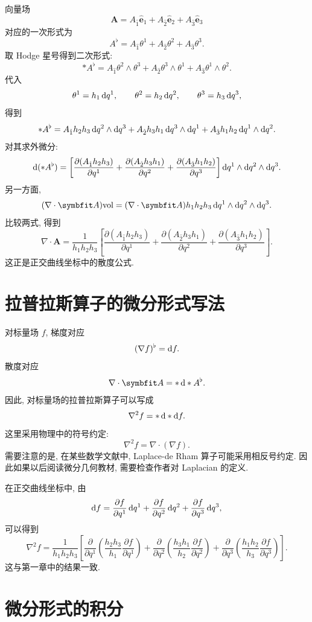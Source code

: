 向量场
\[
\bm{A}
=
A_{\hat 1}\hat{\bm{e}}_1
+
A_{\hat 2}\hat{\bm{e}}_2
+
A_{\hat 3}\hat{\bm{e}}_3
\]
对应的一次形式为
\[
A^\flat
=
A_{\hat 1}\theta^1
+
A_{\hat 2}\theta^2
+
A_{\hat 3}\theta^3.
\]
取 Hodge 星号得到二次形式: 
\[
*A^\flat
=
A_{\hat 1}\theta^2\wedge\theta^3
+
A_{\hat 2}\theta^3\wedge\theta^1
+
A_{\hat 3}\theta^1\wedge\theta^2.
\]
代入
\[
\theta^1=h_1\mathop{}\!\mathrm{d} q^1,
\qquad
\theta^2=h_2\mathop{}\!\mathrm{d} q^2,
\qquad
\theta^3=h_3\mathop{}\!\mathrm{d} q^3,
\]
得到
\[
*A^\flat
=
A_{\hat 1}h_2h_3\mathop{}\!\mathrm{d} q^2\wedge \mathop{}\!\mathrm{d} q^3
+
A_{\hat 2}h_3h_1\mathop{}\!\mathrm{d} q^3\wedge \mathop{}\!\mathrm{d} q^1
+
A_{\hat 3}h_1h_2\mathop{}\!\mathrm{d} q^1\wedge \mathop{}\!\mathrm{d} q^2.
\]
对其求外微分: 
\[
\mathop{}\!\mathrm{d}(*A^\flat)
=
\left[
\frac{\partial(A_{\hat 1}h_2h_3)}{\partial q^1}
+
\frac{\partial(A_{\hat 2}h_3h_1)}{\partial q^2}
+
\frac{\partial(A_{\hat 3}h_1h_2)}{\partial q^3}
\right]
\mathop{}\!\mathrm{d} q^1\wedge \mathop{}\!\mathrm{d} q^2\wedge \mathop{}\!\mathrm{d} q^3.
\]
另一方面, 
\[
(\nabla\cdot\bm{A})\mathrm{vol}
=
(\nabla\cdot\bm{A})
h_1h_2h_3
\dif q^1\wedge \dif q^2\wedge \dif q^3.
\]
比较两式, 得到
\[
\nabla\cdot\bm{A}
=
\frac{1}{h_1h_2h_3}
\left[
\frac{\partial(A_{\hat 1}h_2h_3)}{\partial q^1}
+
\frac{\partial(A_{\hat 2}h_3h_1)}{\partial q^2}
+
\frac{\partial(A_{\hat 3}h_1h_2)}{\partial q^3}
\right].
\]
这正是正交曲线坐标中的散度公式. 

\section{拉普拉斯算子的微分形式写法}

对标量场 $f$, 梯度对应
\[
(\nabla f)^\flat=\mathop{}\!\mathrm{d} f.
\]
散度对应
\[
\nabla\cdot\bm{A}=*\dif *A^\flat.
\]
因此, 对标量场的拉普拉斯算子可以写成
\[
\nabla^2 f=*\mathop{}\!\mathrm{d} *\mathop{}\!\mathrm{d} f.
\]
这里采用物理中的符号约定: 
\[
\nabla^2 f=\nabla\cdot(\nabla f).
\]
需要注意的是, 在某些数学文献中, Laplace-de Rham 算子可能采用相反号约定. 因此如果以后阅读微分几何教材, 需要检查作者对 Laplacian 的定义. 

在正交曲线坐标中, 由
\[
\mathop{}\!\mathrm{d} f
=
\frac{\partial f}{\partial q^1}\mathop{}\!\mathrm{d} q^1
+
\frac{\partial f}{\partial q^2}\mathop{}\!\mathrm{d} q^2
+
\frac{\partial f}{\partial q^3}\mathop{}\!\mathrm{d} q^3,
\]
可以得到
\[
\nabla^2 f
=
\frac{1}{h_1h_2h_3}
\left[
\frac{\partial}{\partial q^1}
\left(
\frac{h_2h_3}{h_1}
\frac{\partial f}{\partial q^1}
\right)
+
\frac{\partial}{\partial q^2}
\left(
\frac{h_3h_1}{h_2}
\frac{\partial f}{\partial q^2}
\right)
+
\frac{\partial}{\partial q^3}
\left(
\frac{h_1h_2}{h_3}
\frac{\partial f}{\partial q^3}
\right)
\right].
\]
这与第一章中的结果一致. 

\section{微分形式的积分}

